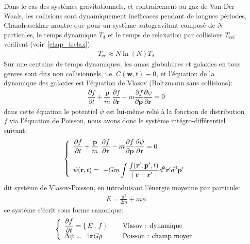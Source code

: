 Dans le cas des systèmes gravitationnels, et contrairement au gaz de Van Der Waals, les collisions sont dynamiquement inefficaces pendant de longues
périodes, Chandrasekhar montre que pour un système autogravitant composé de $N$ particules, le temps dynamique $T_{d}$ et le temps de
relaxation par collisions $T_{rel}$ vérifient (voir~\ref{chap_trelax}):
\begin{align*}
	T_{rc}\approx N\ln\left(  N\right)  T_{d}%
\end{align*}
Sur une centaine de temps dynamiques, les amas globulaires et galaxies en tous genres sont dits non collisionnels, i.e. $C\left(  \mathbf{w}
,t\right)  \equiv0$, et l'équation de la dynamique des galaxies est l'équation de Vlasov (Boltzmann sans collisions):
\begin{align*}
	\dfrac{\partial f}{\partial t}+\dfrac{\mathbf{p}}{m}\ \dfrac{\partial f}{\partial\mathbf{r}}-m\dfrac{\partial f}{\partial\mathbf{p}}\dfrac
	{\partial\psi}{\partial\mathbf{r}}=0
\end{align*}
dans cette équation le potentiel $\psi$ est lui-même relié à la fonction de distribution $f$ via l'équation de Poisson, nous avons donc le système
intégro-différentiel suivant:
\begin{align*}
	\left\{
		\begin{array}[c]{l}%
			\dfrac{\partial f}{\partial t}+\dfrac{\mathbf{p}}{m}\ \dfrac{\partial f}{\partial\mathbf{r}}-m\dfrac{\partial f}{\partial\mathbf{p}}\dfrac
			{\partial\psi}{\partial\mathbf{r}}=0\\
			\\
			\psi(\mathbf{r},t\mathbf{)}=~-Gm\displaystyle\int\dfrac{f(\mathbf{r}^{\prime},\mathbf{p}^{\prime},t)}{\mid\mathbf{r}-\mathbf{r}^{\prime}\mid}%
			d^{3}\mathbf{r}^{\prime}d^{3}\mathbf{p}^{\prime}%
		\end{array}
	\right.
\end{align*}
dit système de Vlasov-Poisson, en introduisant l'énergie moyenne par particule:
\begin{align*}
	E=\frac{\mathbf{p}^{2}}{2m}+m\psi
\end{align*}
ce système s'écrit sous forme canonique:
\begin{align*}
	\left\{
		\begin{array}[c]{lll}%
			\dfrac{\partial f}{\partial t}=\left\{  \,E\,,\,f\,\right\}   &  & \text{{\ {Vlasov} : dynamique}}\\
			\Delta\psi=~4\pi G\rho &  & \text{{\ {Poisson} : champ {moyen}}}%
		\end{array}
	\right.
\end{align*}



